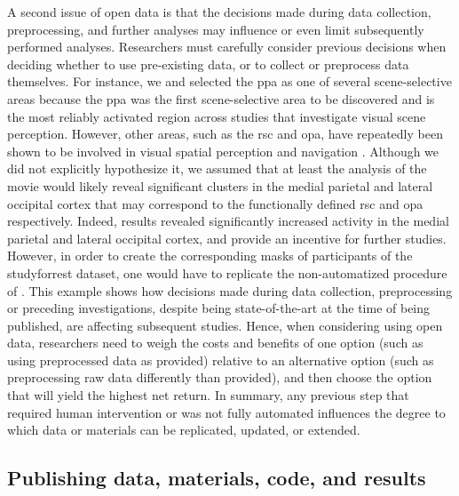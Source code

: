 A second issue of open data is that the decisions made during data collection,
preprocessing, and further analyses may influence or even limit subsequently
performed analyses.
%
Researchers must carefully consider previous decisions when deciding whether to
use pre-existing data, or to collect or preprocess data themselves.
%
For instance, we and \citet{sengupta2016extension} selected the \ac{ppa} as one
of several scene-selective areas because the \ac{ppa} was the first
scene-selective area to be discovered and is the most reliably activated region
across studies that investigate visual scene perception.
%
However, other areas, such as the \ac{rsc} and \ac{opa}, have repeatedly been
shown to be involved in visual spatial perception and navigation
\citep{chrastil2018heterogeneity, bettencourt2013role, dilks2013occipital,
epstein2019scene}.
%
Although we did not explicitly hypothesize it, we assumed that at least the
analysis of the movie would likely reveal significant clusters in the medial
parietal and lateral occipital cortex that may correspond to the functionally
defined \ac{rsc} and \ac{opa} respectively.
%
Indeed, results revealed significantly increased activity in the medial parietal
and lateral occipital cortex, and provide an incentive for further studies.
However, in order to create the corresponding masks of participants of the
studyforrest dataset, one would have to replicate the non-automatized procedure
of \citet{sengupta2016extension}.
%
This example shows how decisions made during data collection, preprocessing or
preceding investigations, despite being state-of-the-art at the time of being
published, are affecting subsequent studies.
Hence, when considering using open data, researchers need to weigh the costs and
benefits of one option (such as using preprocessed data as provided) relative to
an alternative option (such as preprocessing raw data differently than
provided), and then choose the option that will yield the highest net return.
%
In summary, any previous step that required human intervention or was not fully
automated influences the degree to which data or materials can be replicated,
updated, or extended.




\subsection{Publishing data, materials, code, and results}

